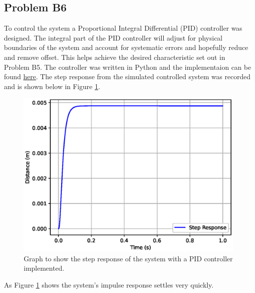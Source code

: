 \subsection*{Problem B6}
    \hfill \break
    To control the system a Proportional Integral Differential (PID) controller was designed. The integral part of the PID controller will adjust for physical boundaries of the system and account for systematic errors and hopefully reduce and remove offset. This helps achieve the desired characteristic set out in Problem B5. The controller was written in Python and the implementaion can be found \href{https://github.com/drlim2u/ELE2024-Control-Coursework/blob/059953dc7b2d8ba0a86b6f437153ceb4442b7a60/PartB.py#L187}{here}. The step response from the simulated controlled system was recorded and is shown below in Figure \ref{fig:problem_b6}.
    
    \begin{figure}[H]
        \centering
        \includegraphics[width=0.6\linewidth]{figures/problem_b6.eps}
        \caption{Graph to show the step response of the system with a PID controller implemented.}
        \label{fig:problem_b6}
    \end{figure}
    
    As Figure \ref{fig:problem_b6} shows the system's impulse response settles very quickly.
